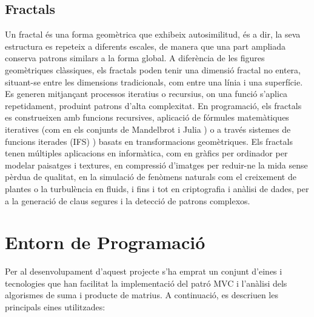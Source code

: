\documentclass{ieeetj}
\begin{document}
\subsection{Fractals  }
Un  fractal és una forma geomètrica que exhibeix autosimilitud, és a dir, la seva estructura es repeteix a diferents escales, de manera que una part ampliada conserva patrons similars a la forma global. A diferència de les figures geomètriques clàssiques, els fractals poden tenir una dimensió fractal no entera, situant-se entre les dimensions tradicionals, com entre una línia i una superfície. Es generen mitjançant processos iteratius o recursius, on una funció s'aplica repetidament, produint patrons d'alta complexitat. En programació, els fractals es construeixen amb funcions recursives, aplicació de fórmules matemàtiques iteratives (com en els conjunts de Mandelbrot i Julia \cite{sims}) o a través  sistemes de funcions iterades (IFS) \cite{ifs}) basats en transformacions geomètriques. Els fractals tenen múltiples aplicacions en informàtica, com en gràfics per ordinador per modelar paisatges i textures, en compressió d’imatges per reduir-ne la mida sense pèrdua de qualitat, en la simulació de fenòmens naturals com el creixement de plantes o la turbulència en fluids, i fins i tot en criptografia i anàlisi de dades, per a la generació de claus segures i la detecció de patrons complexos.
\section{Entorn de Programació}
Per al desenvolupament d'aquest projecte s'ha emprat un conjunt d'eines i tecnologies que han facilitat la implementació del patró MVC i l'anàlisi dels algorismes de suma i producte de matrius. A continuació, es descriuen les principals eines utilitzades:
\end{document}
